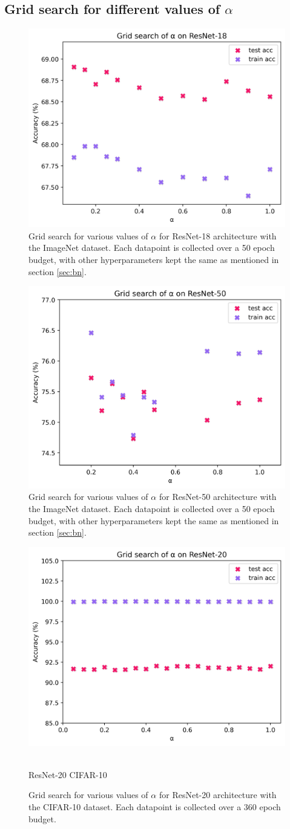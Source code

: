 \documentclass[times,sort&compress]{elsarticle}
\begin{document}
\clearpage


\subsection{Grid search for different values of $\alpha$}


\begin{figure}[ht]
\centering
\includegraphics[width=0.5\columnwidth]{r18_grid_search}
\caption{ Grid search for various values of $\alpha$ for ResNet-18 architecture with the
ImageNet dataset. Each datapoint is collected over a 50 epoch budget, with other
hyperparameters kept the same as mentioned in section \ref{sec:bn}. }
\label{fig:grid_searcha}
\end{figure}


\begin{figure}[ht]
\centering
\includegraphics[width=0.5\columnwidth]{r50_grid_search}
\caption{ Grid search for various values of $\alpha$ for ResNet-50 architecture with the
ImageNet dataset. Each datapoint is collected over a 50 epoch budget, with other
hyperparameters kept the same as mentioned in section \ref{sec:bn}. }
\label{fig:grid_searchb}
\end{figure}


\begin{figure}[ht]
\centering
\includegraphics[width=0.5\columnwidth]{cifar10_grid_search}
\caption{\\ResNet-20 CIFAR-10}
\caption{ Grid search for various values of $\alpha$ for ResNet-20 architecture with the
CIFAR-10 dataset. Each datapoint is collected over a 360 epoch budget. }
\label{fig:grid_searchc}
\end{figure}
\end{document}
